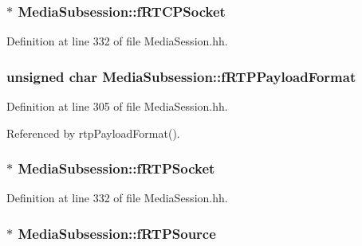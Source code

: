 \subsubsection[{f\+R\+T\+C\+P\+Socket}]{$\ast$ Media\+Subsession\+::f\+R\+T\+C\+P\+Socket\hspace{0.3cm}{\ttfamily [protected]}}\label{classMediaSubsession_aece92d01bea8bfdfe098bfd449713b6a}


Definition at line 332 of file Media\+Session.\+hh.

\subsubsection[{f\+R\+T\+P\+Payload\+Format}]{\setlength{\rightskip}{0pt plus 5cm}unsigned char Media\+Subsession\+::f\+R\+T\+P\+Payload\+Format\hspace{0.3cm}{\ttfamily [protected]}}\label{classMediaSubsession_ac9df113c877fe277fcf8faf5754a5fb7}


Definition at line 305 of file Media\+Session.\+hh.



Referenced by rtp\+Payload\+Format().

\subsubsection[{f\+R\+T\+P\+Socket}]{$\ast$ Media\+Subsession\+::f\+R\+T\+P\+Socket\hspace{0.3cm}{\ttfamily [protected]}}\label{classMediaSubsession_ab177648d411e3189db1b31a47712a7bb}


Definition at line 332 of file Media\+Session.\+hh.

\subsubsection[{f\+R\+T\+P\+Source}]{$\ast$ Media\+Subsession\+::f\+R\+T\+P\+Source\hspace{0.3cm}{\ttfamily [protected]}}\label{classMediaSubsession_adb474f0d79fe21b54f12e14341238edc}


